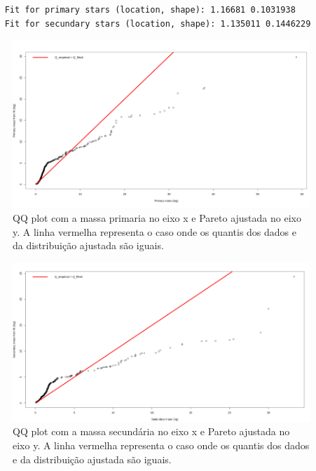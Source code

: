 \begin{lstlisting}
    Fit for primary stars (location, shape): 1.16681 0.1031938 
    Fit for secundary stars (location, shape): 1.135011 0.1446229
\end{lstlisting}

\begin{figure}
    \centering
    \includegraphics[width=0.9\linewidth]{Figuras/Captura de tela 2025-06-01 113313.png}
    \caption{QQ plot com a massa primaria no eixo x e Pareto ajustada no eixo y. A linha vermelha representa o caso onde os quantis dos dados e da distribuição ajustada são iguais.}
\end{figure}

\begin{figure}
    \centering
    \includegraphics[width=0.9\linewidth]{Figuras/Captura de tela 2025-06-01 113326.png}
    \caption{QQ plot com a massa secundária no eixo x e Pareto ajustada no eixo y. A linha vermelha representa o caso onde os quantis dos dados e da distribuição ajustada são iguais.}
\end{figure}